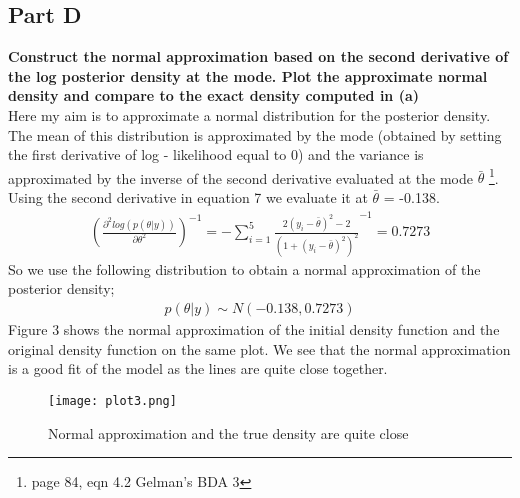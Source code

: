 \documentclass{article}
\begin{document}
\subsection{Part D}
\textbf{Construct the normal approximation based on the second derivative of the log posterior density at the mode. Plot the approximate normal density and compare to the exact density computed in (a)}\\
Here my aim is to approximate a normal distribution for the posterior density. The mean of this distribution is approximated by the mode (obtained by setting the first derivative of log - likelihood equal to 0) and the variance is approximated by the inverse of the second derivative evaluated at the mode $\bar{\theta}$ \footnote{page 84, eqn 4.2 Gelman's BDA 3}.\\
Using the second derivative in equation 7 we evaluate it at $\bar{\theta}$ = -0.138.
  \begin{align}
(\frac{\partial^2log(p(\theta | y))}{\partial \theta^2})^{-1} = - \sum_{i=1}^{5} \frac{ 2(y_i - \bar{\theta})^2 - 2}{(1 + (y_i - \bar{\theta})^2)^2}^{-1} = 0.7273
 \end{align}
 So we use the following distribution to obtain a normal approximation of the posterior density;
 \begin{align}
 p(\theta|y) \sim N(-0.138,0.7273)
 \end{align}
 Figure 3 shows the normal approximation of the initial density function and the original density function on the same plot. We see that the normal approximation is a good fit of the model as the lines are quite close together.
 
 \begin{figure}[H]
\centering
\texttt{[image: plot3.png]}
\caption{Normal approximation and the true density are quite close}
\label{deltat}
\end{figure}
\newpage
\end{document}
